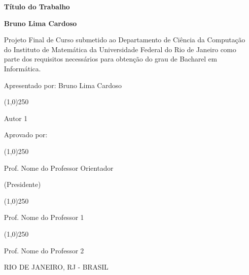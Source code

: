 \begin{titlepage}
\clearpage
\bigskip


\bigskip


\bigskip

\centerline{\textbf{\large T\'itulo do Trabalho}}


\bigskip


\bigskip

\centerline{\textbf{Bruno Lima Cardoso}}



\bigskip


\bigskip

Projeto Final de Curso submetido ao Departamento de Ci\^encia da Computa\c{c}\~ao do Instituto de Matem\'atica da Universidade Federal do Rio de Janeiro como parte dos requisitos necess\'arios para obten\c{c}\~ao do grau de Bacharel em Inform\'atica.


\bigskip

Apresentado por: Bruno Lima Cardoso


\bigskip


\hfill
\line(1,0){250}

\hfill
Autor 1

\bigskip

\hfil
Aprovado por:

\bigskip

\bigskip

\hfill
\line(1,0){250}

\hfill
Prof. Nome do Professor Orientador

\hfill
(Presidente)

\bigskip

\bigskip

\bigskip

\hfill
\line(1,0){250}

\hfill
Prof. Nome do Professor 1

\bigskip

\bigskip

\bigskip

\hfill
\line(1,0){250} 

\hfill
Prof. Nome do Professor 2

\bigskip

\bigskip

\bigskip

\bigskip

\begin{center}

RIO DE JANEIRO, RJ - BRASIL


\end{center}
\end{titlepage}
